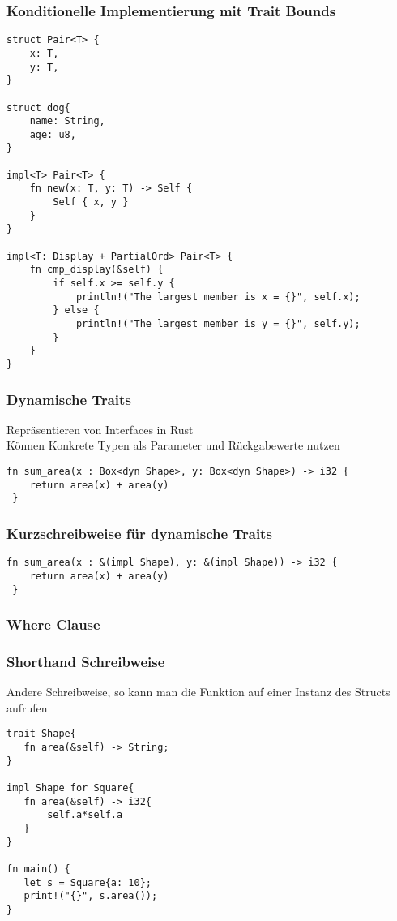 \documentclass[a4paper, 1ppt]{article}
\begin{document}
\subsubsection{Konditionelle Implementierung mit Trait Bounds}
\begin{verbatim}
struct Pair<T> {
    x: T,
    y: T,
}

struct dog{
    name: String,
    age: u8,
}

impl<T> Pair<T> {
    fn new(x: T, y: T) -> Self {
        Self { x, y }
    }
}

impl<T: Display + PartialOrd> Pair<T> {
    fn cmp_display(&self) {
        if self.x >= self.y {
            println!("The largest member is x = {}", self.x);
        } else {
            println!("The largest member is y = {}", self.y);
        }
    }
}
\end{verbatim}
\subsubsection{Dynamische Traits}
Repräsentieren von Interfaces in Rust \\
Können Konkrete Typen als Parameter und Rückgabewerte nutzen
\begin{verbatim}
fn sum_area(x : Box<dyn Shape>, y: Box<dyn Shape>) -> i32 {
    return area(x) + area(y)
 }
\end{verbatim}
\subsubsection{Kurzschreibweise für dynamische Traits}
\begin{verbatim}
fn sum_area(x : &(impl Shape), y: &(impl Shape)) -> i32 {
    return area(x) + area(y)
 }
\end{verbatim}
\subsubsection{Where Clause}
\subsubsection{Shorthand Schreibweise}
Andere Schreibweise, so kann man die Funktion auf einer Instanz des Structs aufrufen
\begin{verbatim}
trait Shape{
   fn area(&self) -> String;
}

impl Shape for Square{
   fn area(&self) -> i32{
       self.a*self.a
   }
}

fn main() {
   let s = Square{a: 10};
   print!("{}", s.area());
}
\end{verbatim}
\end{document}
